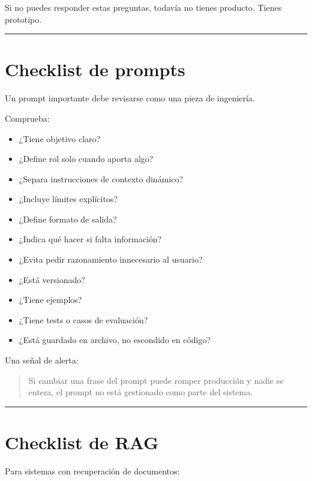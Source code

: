 Si no puedes responder estas preguntas, todavía no tienes producto.
Tienes prototipo.

\begin{center}\rule{0.5\linewidth}{0.5pt}\end{center}

\section{Checklist de prompts}\label{checklist-de-prompts}

Un prompt importante debe revisarse como una pieza de ingeniería.

Comprueba:

\begin{itemize}
\tightlist
\item
  ¿Tiene objetivo claro?
\item
  ¿Define rol solo cuando aporta algo?
\item
  ¿Separa instrucciones de contexto dinámico?
\item
  ¿Incluye límites explícitos?
\item
  ¿Define formato de salida?
\item
  ¿Indica qué hacer si falta información?
\item
  ¿Evita pedir razonamiento innecesario al usuario?
\item
  ¿Está versionado?
\item
  ¿Tiene ejemplos?
\item
  ¿Tiene tests o casos de evaluación?
\item
  ¿Está guardado en archivo, no escondido en código?
\end{itemize}

Una señal de alerta:

\begin{quote}
Si cambiar una frase del prompt puede romper producción y nadie se
entera, el prompt no está gestionado como parte del sistema.
\end{quote}

\begin{center}\rule{0.5\linewidth}{0.5pt}\end{center}

\section{Checklist de RAG}\label{checklist-de-rag}

Para sistemas con recuperación de documentos:

